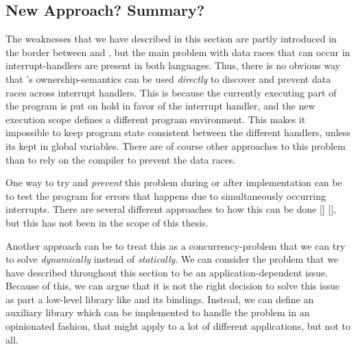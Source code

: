 

\subsection{New Approach? Summary?}

The weaknesses that we have described in this section are partly introduced in the border between {\rust} and {\C}, but the main problem with data races that can occur in interrupt-handlers are present in both languages.
Thus, there is no obvious way that {\rust}'s ownership-semantics can be used \emph{directly} to discover and prevent data races across interrupt handlers.
This is because the currently executing part of the program is put on hold in favor of the interrupt handler, and the new execution scope defines a different program environment.
This makes it impossible to keep program state consistent between the different handlers, unless its kept in global variables.
There are of course other approaches to this problem than to rely on the compiler to prevent the data races.

One way to try and \emph{prevent} this problem during or after implementation can be to test the program for errors that happens due to simultaneously occurring interrupts.
There are several different approaches to how this can be done [] [], but this has not been in the scope of this thesis.

Another approach can be to treat this as a concurrency-problem that we can try to solve \emph{dynamically} instead of \emph{statically}.
We can consider the problem that we have described throughout this section to be an application-dependent issue.
Because of this, we can argue that it is not the right decision to solve this issue as part a low-level library like {\emlib} and its bindings.
Instead, we can define an auxiliary library which can be implemented to handle the problem in an opinionated fashion, that might apply to a lot of different applications, but not to all.

